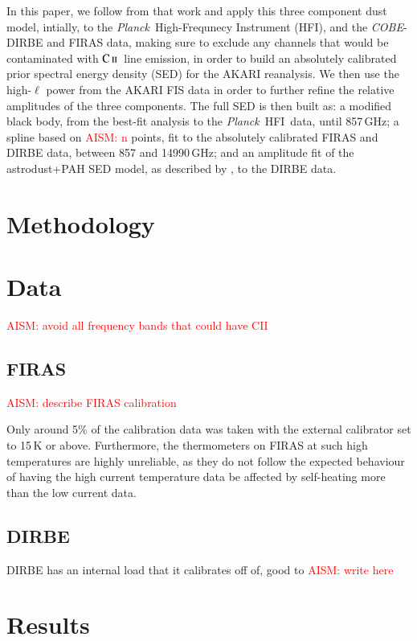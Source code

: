 \documentclass{aa}
\def\Planck{\textit{Planck}}
\def\COBE{\textit{COBE}}
\newcommand{\CII}{\ensuremath{\textsc{C\,ii}}}
\newcommand{\hfi}[0]{HFI}
\newcommand{\aism}[1]{\textcolor{red}{{AISM:} #1}}
\begin{document}
In this paper, we follow from that work and apply this three component dust model, intially, to the \Planck\ High-Frequnecy Instrument (HFI), and the \COBE- DIRBE and FIRAS data, making sure to exclude any channels that would be contaminated with \CII\ line emission, in order to build an absolutely calibrated prior spectral energy density (SED) for the AKARI reanalysis. We then use the high-$\ell$ power from the AKARI FIS data in order to further refine the relative amplitudes of the three components. The full SED is then built as: a modified black body, from the best-fit analysis to the \Planck\ \hfi\ data, until 857\,GHz; a spline based on \aism{n} points, fit to the absolutely calibrated FIRAS and DIRBE data, between 857 and 14990\,GHz; and an amplitude fit of the astrodust+PAH SED model, as described by \cite{Hensley2023}, to the DIRBE data.

\section{Methodology}

\section{Data}

\aism{avoid all frequency bands that could have CII}

\subsection{FIRAS}

\aism{describe FIRAS calibration}

Only around 5\% of the calibration data was taken with the external calibrator set to 15\,K or above. Furthermore, the thermometers on FIRAS at such high temperatures are highly unreliable, as they do not follow the expected behaviour of having the high current temperature data be affected by self-heating more than the low current data. 

\subsection{DIRBE}
DIRBE has an internal load that it calibrates off of, good to \aism{write here}

\section{Results}
\end{document}
